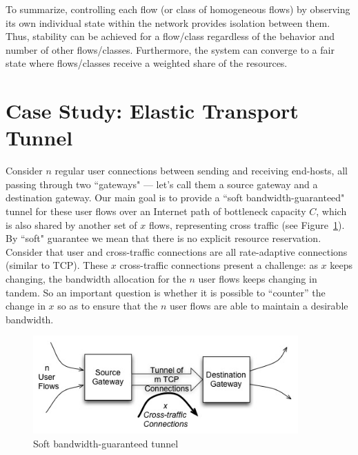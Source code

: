 \documentclass{article}
\begin{document}
To summarize,
controlling each flow (or class of homogeneous flows) 
by observing its own individual state 
within the network 
provides isolation between them.
Thus, stability can be achieved 
for a flow/class regardless of
the behavior and number of other flows/classes.
Furthermore, 
the system can converge to
a fair state where flows/classes receive
a weighted share of the resources.




\section{Case Study: Elastic Transport Tunnel}
\label{sec:case2}

  Consider $n$ regular user connections between sending and receiving
  end-hosts, all passing through two ``gateways" --- let's call them a source gateway and
  a destination gateway.  Our main goal
  is to provide a ``soft bandwidth-guaranteed" tunnel \cite{MinaBestavrosMattaX:iscc04} for these user
  flows over an Internet path of bottleneck capacity $C$, which is
  also shared by another set of $x$ flows, representing cross traffic
  (see Figure~\ref{fig:case2-tunnel}).
  By ``soft" guarantee we mean that there is no explicit resource reservation.
  Consider that user and cross-traffic connections
  are all rate-adaptive connections (similar to TCP). 
  These $x$ cross-traffic connections present a
  challenge: as $x$ keeps changing, the bandwidth allocation for the
  $n$ user flows keeps changing in tandem.  So an important
  question is whether it is possible to ``counter'' the change in $x$
  so as to ensure that the $n$ user flows are able to maintain a
  desirable bandwidth.
  
  \begin{figure}[htbp] %
     \centering
     \includegraphics[width=4in]{figures/case2-tunnel.jpg} 
     \caption{Soft bandwidth-guaranteed tunnel}
     \label{fig:case2-tunnel}
  \end{figure}
\end{document}
